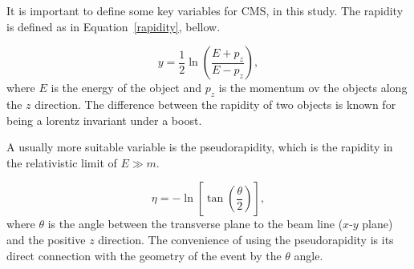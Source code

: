 It is important to define some key variables for CMS, in this study. The rapidity is defined as in Equation~\ref{rapidity}, bellow.

\begin{equation}
    y=\frac{1}{2} \ln \left( \frac{E+p_z}{E-p_z} \right),
    \label{rapidity}
\end{equation}
where $E$ is the energy of the object and $p_z$ is the momentum ov the objects along the $z$ direction. The difference between the rapidity of two objects is known for being a lorentz invariant under a boost.

A usually more suitable variable is the pseudorapidity, which is the rapidity in the relativistic limit of $E \gg m$.

\begin{equation}
    \eta = - \ln \left [ \tan \left( \frac{\theta}{2} \right)\right],
    \label{pseudorapidity}
\end{equation}
where $\theta$ is the angle between the transverse plane to the beam line ($x$-$y$ plane) and the positive $z$ direction. The convenience of using the pseudorapidity is its direct connection with the geometry of the event by the $\theta$ angle.




